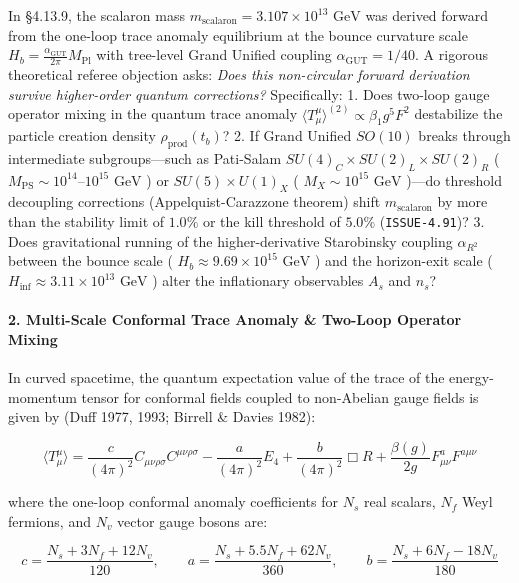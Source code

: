 \documentclass[11pt,a4paper]{article}
\theoremstyle{definition}\newtheorem{definition}{Definition}
\theoremstyle{remark}\newtheorem{remark}{Remark}
\begin{document}
In §4.13.9, the scalaron mass $m_{\text{scalaron}} = 3.107 \times 10^{13}\text{ GeV}$ was derived forward from the one-loop trace anomaly equilibrium at the bounce curvature scale $H_b = \frac{\alpha_{\text{GUT}}}{2\pi} M_{\text{Pl}}$ with tree-level Grand Unified coupling $\alpha_{\text{GUT}} = 1/40$. A rigorous theoretical referee objection asks: \textit{Does this non-circular forward derivation survive higher-order quantum corrections?} Specifically:
1. Does two-loop gauge operator mixing in the quantum trace anomaly $\langle T^\mu_\mu \rangle^{(2)} \propto \beta_1 g^5 F^2$ destabilize the particle creation density $\rho_{\text{prod}}(t_b)$?
2. If Grand Unified $SO(10)$ breaks through intermediate subgroups—such as Pati-Salam $SU(4)_C \times SU(2)_L \times SU(2)_R$ ( $M_{\text{PS}} \sim 10^{14}\text{--}10^{15}\text{ GeV}$ ) or $SU(5) \times U(1)_X$ ( $M_X \sim 10^{15}\text{ GeV}$ )—do threshold decoupling corrections (Appelquist-Carazzone theorem) shift $m_{\text{scalaron}}$ by more than the stability limit of $1.0\%$ or the kill threshold of $5.0\%$ (\texttt{ISSUE-4.91})?
3. Does gravitational running of the higher-derivative Starobinsky coupling $\alpha_{R^2}$ between the bounce scale ( $H_b \approx 9.69 \times 10^{15}\text{ GeV}$ ) and the horizon-exit scale ( $H_{\text{inf}} \approx 3.11 \times 10^{13}\text{ GeV}$ ) alter the inflationary observables $A_s$ and $n_s$?
\paragraph{2. Multi-Scale Conformal Trace Anomaly \& Two-Loop Operator Mixing}

In curved spacetime, the quantum expectation value of the trace of the energy-momentum tensor for conformal fields coupled to non-Abelian gauge fields is given by (Duff 1977, 1993; Birrell \& Davies 1982):


\begin{equation}
\langle T^\mu_\mu \rangle = \frac{c}{(4\pi)^2} C_{\mu\nu\rho\sigma} C^{\mu\nu\rho\sigma} - \frac{a}{(4\pi)^2} E_4 + \frac{b}{(4\pi)^2} \Box R + \frac{\beta(g)}{2g} F_{\mu\nu}^a F^{a\mu\nu}
\end{equation}


where the one-loop conformal anomaly coefficients for $N_s$ real scalars, $N_f$ Weyl fermions, and $N_v$ vector gauge bosons are:


\begin{equation}
c = \frac{N_s + 3 N_f + 12 N_v}{120}, \qquad a = \frac{N_s + 5.5 N_f + 62 N_v}{360}, \qquad b = \frac{N_s + 6 N_f - 18 N_v}{180}
\end{equation}
\end{document}
